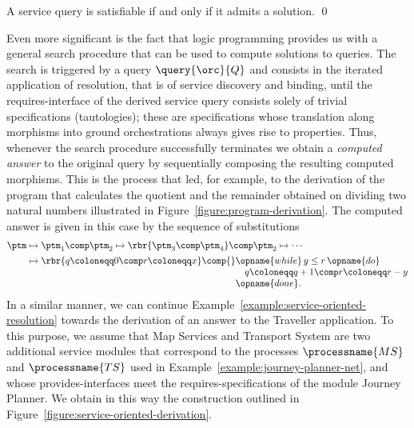 \documentclass{LMCS}
\begin{document}
  \begin{prop}
    \label{proposition:characterization-of-satisfiable-service-queries}
    A service query is satisfiable if and only if it admits a solution.
    \qed
  \end{prop}

  Even more significant is the fact that logic programming provides us with a general search procedure that can be used to compute solutions to queries.
  The search is triggered by a query \(\query{\orc}{Q}\) and consists in the iterated application of resolution, that is of service discovery and binding, until the requires-interface of the derived service query consists solely of trivial specifications (tautologies); these are specifications whose translation along morphisms into ground orchestrations always gives rise to properties.
  Thus, whenever the search procedure successfully terminates we obtain a \emph{computed answer} to the original query by sequentially composing the resulting computed morphisms.
  This is the process that led, for example, to the derivation of the program that calculates the quotient and the remainder obtained on dividing two natural numbers illustrated in Figure~\ref{figure:program-derivation}.
  The computed answer is given in this case by the sequence of substitutions
  \[
  \setlength{\arraycolsep}{0pt}
  \begin{array}{rl}
    \ptm & {}
           \mapsto \ptm_{1} \comp \ptm_{2}
           \mapsto \rbr{\ptm_{3} \comp \ptm_{4}} \comp \ptm_{2}
           \mapsto \dotsb \\[1ex]
         & {\begin{array}{rl}
              {} \mapsto \rbr{q \coloneqq 0 \comp r \coloneqq x} \comp {} & \opname{while}\, y \leq r\, \opname{do} \\
                                                                          & \hspace{1em} q \coloneqq q + 1 \comp r \coloneqq r - y \\
                                                                          & \opname{done}.
            \end{array}}
  \end{array}
  \]
  In a similar manner, we can continue Example~\ref{example:service-oriented-resolution} towards the derivation of an answer to the Traveller application.
  To this purpose, we assume that Map Services and Transport System are two additional service modules that correspond to the processes \(\processname{MS}\) and \(\processname{TS}\) used in Example~\ref{example:journey-planner-net}, and whose provides-interfaces meet the requires-specifications of the module Journey Planner.
  We obtain in this way the construction outlined in Figure~\ref{figure:service-oriented-derivation}.
\end{document}

